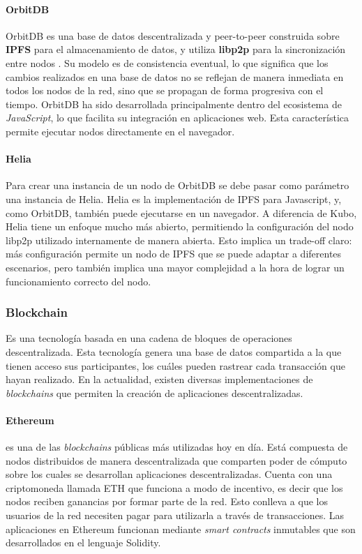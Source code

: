 \paragraph{OrbitDB}
OrbitDB es una base de datos descentralizada y peer-to-peer construida sobre \textbf{IPFS} para el almacenamiento de datos, y utiliza \textbf{libp2p} para la sincronización entre nodos \cite{orbitdb}. Su modelo es de consistencia eventual, lo que significa que los cambios realizados en una base de datos no se reflejan de manera inmediata en todos los nodos de la red, sino que se propagan de forma progresiva con el tiempo.
OrbitDB ha sido desarrollada principalmente dentro del ecosistema de \textit{JavaScript}, lo que facilita su integración en aplicaciones web. Esta característica permite ejecutar nodos directamente en el navegador.

\paragraph{Helia} Para crear una instancia de un nodo de OrbitDB se debe pasar como parámetro una instancia de Helia. Helia \cite{helia} es la implementación de IPFS para Javascript, y, como OrbitDB, también puede ejecutarse en un navegador. A diferencia de Kubo, Helia tiene un enfoque mucho más abierto, permitiendo la configuración del nodo libp2p utilizado internamente de manera abierta. Esto implica un trade-off claro: más configuración permite un nodo de IPFS que se puede adaptar a diferentes escenarios, pero también implica una mayor complejidad a la hora de lograr un funcionamiento correcto del nodo.

\subsubsection{Blockchain}

Es una tecnología basada en una cadena de bloques de operaciones descentralizada.  Esta tecnología genera una base de datos compartida a la que tienen acceso sus participantes, los cuáles pueden rastrear cada transacción que hayan realizado. En la actualidad, existen diversas implementaciones de \textit{blockchains} que permiten la creación de aplicaciones descentralizadas.

\paragraph{Ethereum} \cite{wood2014ethereum} es una de las \textit{blockchains} públicas más utilizadas hoy en día. Está compuesta de nodos distribuidos de manera descentralizada que comparten poder de cómputo sobre los cuales se desarrollan aplicaciones descentralizadas. Cuenta con una criptomoneda llamada ETH que funciona a modo de incentivo, es decir que los nodos reciben ganancias por formar parte de la red. Esto conlleva a que los usuarios de la red necesiten pagar para utilizarla a través de transacciones. Las aplicaciones en Ethereum funcionan mediante \textit{smart contracts} inmutables que son desarrollados en el lenguaje Solidity.

